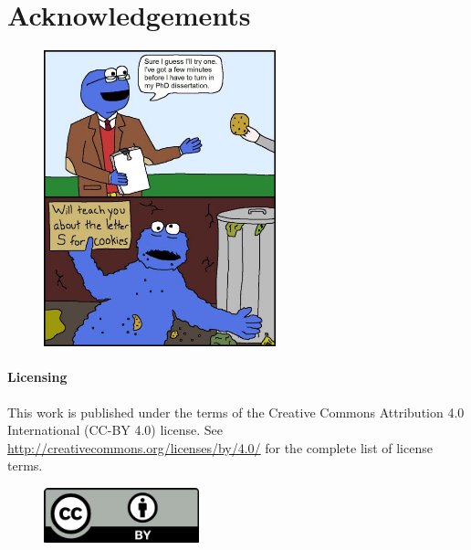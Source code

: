 \chapter*{Acknowledgements}
% 

\begin{figure}[h!]
\centering\includegraphics[width=0.6\textwidth]{figures/will-teach-you-about-the-letter-s-for-cookies.jpg}
\end{figure}

\subsubsection*{Licensing}
This work is published under the terms of the Creative Commons Attribution 4.0 International (CC-BY 4.0) license. See \url{http://creativecommons.org/licenses/by/4.0/} for the complete list of license terms.
\begin{figure}
\centering\includegraphics[width=0.4\textwidth]{figures/cc-by.pdf}
\end{figure}
